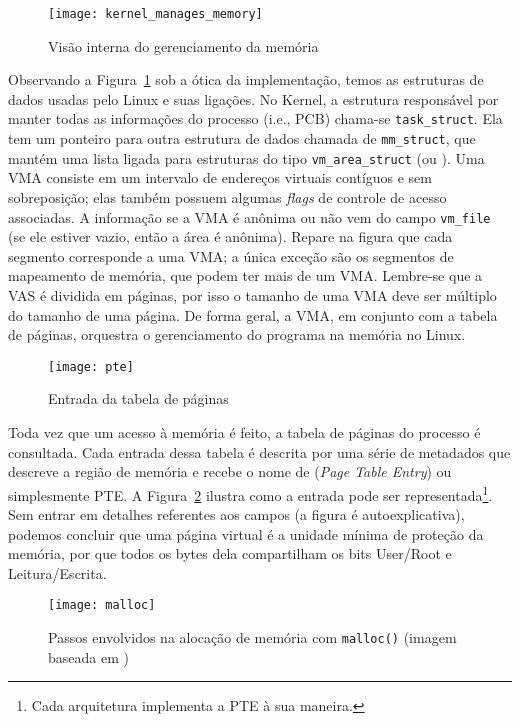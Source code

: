 \begin{figure}[!h]
  \centering
  \texttt{[image: kernel\_manages\_memory]}
	\caption[Visão interna do gerenciamento da memória]{Visão interna do gerenciamento da memória~\citep{kernel_manage_mem}}
  \label{fig:kernel_manages_memory}
\end{figure}

Observando a Figura~\ref{fig:kernel_manages_memory} sob a ótica
da implementação, temos as estruturas de dados usadas pelo Linux e
suas ligações. No Kernel, a estrutura responsável por manter todas as
informações do processo (i.e., PCB) chama-se \texttt{task\_struct}. Ela tem um
ponteiro para outra estrutura de dados chamada de \texttt{mm\_struct}, que
mantém uma lista ligada para estruturas do tipo \texttt{vm\_area\_struct} (ou
). Uma VMA consiste em um intervalo de
endereços virtuais contíguos e sem sobreposição; elas também possuem algumas
\textit{flags} de controle de acesso associadas. A informação se a VMA é
anônima ou não vem do campo \texttt{vm\_file} (se ele estiver vazio, então a
área é anônima). Repare na figura que cada segmento corresponde a uma VMA; a
única exceção são os segmentos de mapeamento de memória, que podem ter mais de um
VMA. Lembre-se que a VAS é dividida em páginas, por isso o tamanho de uma VMA
deve ser múltiplo do tamanho de uma página. De forma geral, a VMA, em conjunto com a
tabela de páginas, orquestra o gerenciamento do programa na memória no Linux.

\begin{figure}[!h]
  \centering
  \texttt{[image: pte]}
  \caption{Entrada da tabela de páginas}
  \label{fig:pte}
\end{figure}

Toda vez que um acesso à memória é feito, a tabela de páginas do processo é
consultada. Cada entrada dessa tabela é descrita por uma série de metadados
que descreve a região de memória e recebe o nome de
 (\textit{Page Table Entry}) ou
simplesmente PTE. A Figura~\ref{fig:pte} ilustra como a entrada pode ser
representada\footnote{Cada arquitetura implementa a PTE à sua maneira.}. Sem
entrar em detalhes referentes aos campos (a figura é autoexplicativa), podemos
concluir que uma página virtual é a unidade mínima de proteção da memória, por que
todos os bytes dela compartilham os bits User/Root e Leitura/Escrita.

\begin{figure}[!h]
  \centering
  \texttt{[image: malloc]}
  \caption[Passos envolvidos na alocação de memória com \texttt{malloc()}]{Passos envolvidos na alocação de memória com \texttt{malloc()} (imagem baseada em \cite{anatomy_program_mem})}
  \label{fig:malloc_linux}
\end{figure}

